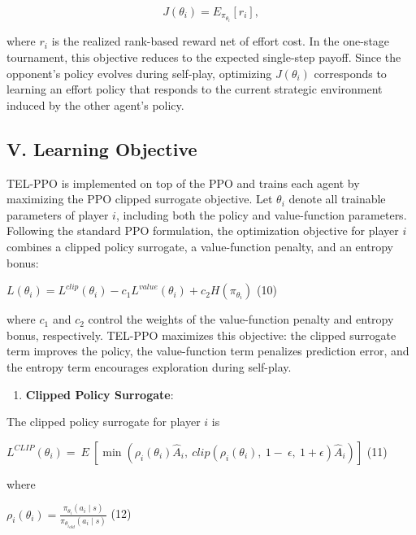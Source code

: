 \documentclass[
]{article}
\begin{document}
\[J(\theta_{i}) = E_{\pi_{\theta_{i}}}\left\lbrack r_{i} \right\rbrack,\]

where \(r_{i}\) is the realized rank-based reward net of effort cost. In
the one-stage tournament, this objective reduces to the expected
single-step payoff. Since the opponent's policy evolves during
self-play, optimizing \(J(\theta_{i})\) corresponds to learning an
effort policy that responds to the current strategic environment induced
by the other agent's policy.

\subsection{\texorpdfstring{\textbf{V. Learning
Objective}}{V. Learning Objective}}\label{v.-learning-objective}

TEL-PPO is implemented on top of the PPO and trains each agent by
maximizing the PPO clipped surrogate objective. Let \(\theta_{i}\)
denote all trainable parameters of player \(i\), including both the
policy and value-function parameters. Following the standard PPO
formulation, the optimization objective for player \(i\) combines a
clipped policy surrogate, a value-function penalty, and an entropy
bonus:

\(L\left( \theta_{i} \right) = L^{clip}\left( \theta_{i} \right) - c_{1}L^{value}\left( \theta_{i} \right) + c_{2}H(\pi_{\theta_{i}})\)
(10)

where \(c_{1}\) and \(c_{2}\) control the weights of the value-function
penalty and entropy bonus, respectively. TEL-PPO maximizes this
objective: the clipped surrogate term improves the policy, the
value-function term penalizes prediction error, and the entropy term
encourages exploration during self-play.

\begin{enumerate}
\def\labelenumi{(\alph{enumi})}
\item
  \textbf{Clipped Policy Surrogate}:
\end{enumerate}

The clipped policy surrogate for player \(i\) is

\(L^{CLIP}\left( \theta_{i} \right) = \ E\ \left\lbrack \min\left( \rho_{i}\left( \theta_{i} \right){\widehat{A}}_{i},\ clip\left( \rho_{i}\left( \theta_{i} \right),\ 1 - \ \epsilon,\ 1 + \epsilon \right){\widehat{A}}_{i} \right) \right\rbrack\)
(11)

where

\(\rho_{i}(\theta_{i}) = \frac{\pi_{\theta_{i}}(a_{i} \mid s)}{\pi_{{\theta_{i}}_{old}}(a_{i} \mid s)}\)
(12)
\end{document}
